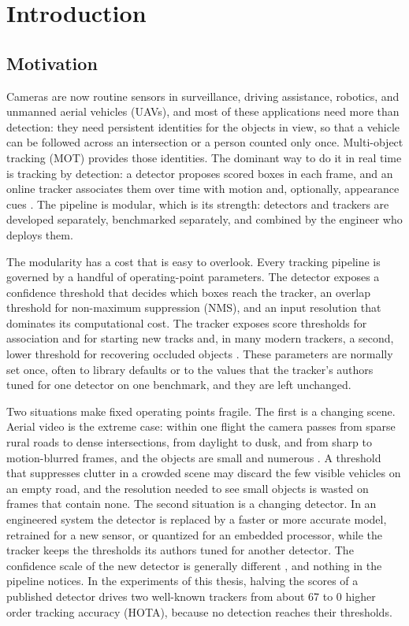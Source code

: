 \chapter{Introduction}\label{ch:intro}

\section{Motivation}
Cameras are now routine sensors in surveillance, driving assistance, robotics, and unmanned aerial vehicles (UAVs), and most of these applications need more than detection: they need persistent identities for the objects in view, so that a vehicle can be followed across an intersection or a person counted only once. Multi-object tracking (MOT) provides those identities. The dominant way to do it in real time is tracking by detection: a detector proposes scored boxes in each frame, and an online tracker associates them over time with motion and, optionally, appearance cues \cite{bewley2016sort,wojke2017deepsort,zhang2022bytetrack}. The pipeline is modular, which is its strength: detectors and trackers are developed separately, benchmarked separately, and combined by the engineer who deploys them.

The modularity has a cost that is easy to overlook. Every tracking pipeline is governed by a handful of operating-point parameters. The detector exposes a confidence threshold that decides which boxes reach the tracker, an overlap threshold for non-maximum suppression (NMS), and an input resolution that dominates its computational cost. The tracker exposes score thresholds for association and for starting new tracks and, in many modern trackers, a second, lower threshold for recovering occluded objects \cite{zhang2022bytetrack}. These parameters are normally set once, often to library defaults or to the values that the tracker's authors tuned for one detector on one benchmark, and they are left unchanged.

Two situations make fixed operating points fragile. The first is a changing scene. Aerial video is the extreme case: within one flight the camera passes from sparse rural roads to dense intersections, from daylight to dusk, and from sharp to motion-blurred frames, and the objects are small and numerous \cite{zhu2022visdrone,du2018uavdt,wu2022uavsurvey}. A threshold that suppresses clutter in a crowded scene may discard the few visible vehicles on an empty road, and the resolution needed to see small objects is wasted on frames that contain none. The second situation is a changing detector. In an engineered system the detector is replaced by a faster or more accurate model, retrained for a new sensor, or quantized for an embedded processor, while the tracker keeps the thresholds its authors tuned for another detector. The confidence scale of the new detector is generally different \cite{kuppers2020detcalib}, and nothing in the pipeline notices. In the experiments of this thesis, halving the scores of a published detector drives two well-known trackers from about 67 to 0 higher order tracking accuracy (HOTA), because no detection reaches their thresholds.

